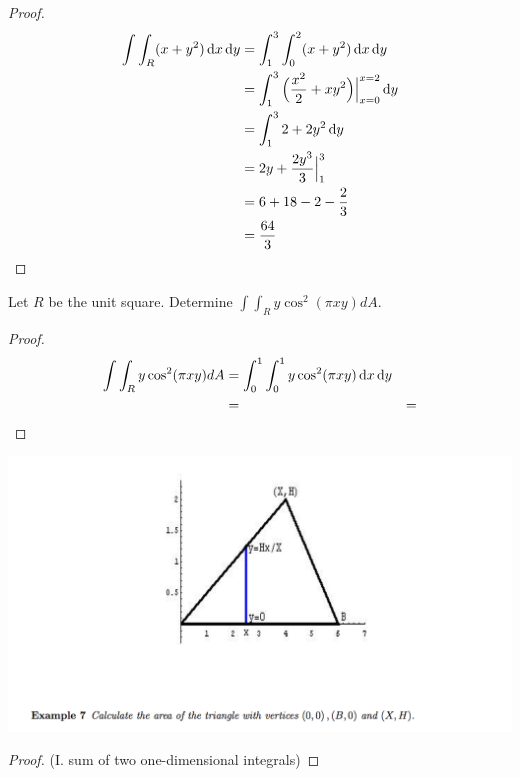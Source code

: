 \begin{example*}[5]

\end{example*}

\begin{proof}
  \begin{align*}
    \int \int_R (x + y^2) \dx\dy
    &= \int_1^3 \int_0^2 (x + y^2) \dx\dy\\
    &= \int_1^3 \Big(\frac{x^2}{2} + xy^2\Big)\Big|_{x=0}^{x=2} \dy\\
    &= \int_1^3 2 + 2y^2 \dy\\
    &= 2y + \frac{2y^3}{3} \Big|_1^3\\
    &= 6 + 18 - 2 - \frac{2}{3}\\
    &= \frac{64}{3}
  \end{align*}
\end{proof}


\begin{example*}[6]
  Let $R$ be the unit square. Determine $\int\int_R y\cos^2(\pi xy) dA$.
\end{example*}


\begin{proof}
  \begin{align*}
    \int\int_R y\cos^2(\pi xy) dA
    &= \int_0^1\int_0^1 y\cos^2(\pi xy) \dx\dy\\
    &=
    &=
  \end{align*}
\end{proof}

\begin{mdframed}
  \includegraphics[width=400pt]{img/oxford-prelims-M5-multivariable-calc-ex-7.png}
\end{mdframed}


\begin{proof}(I. sum of two one-dimensional integrals)
\end{proof}

